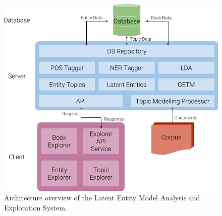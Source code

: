\documentclass[10pt]{report}
\begin{document}
\begin{figure}[h!]
  \centering
  \includegraphics[scale=0.55]{architecture_diagram}

    
  
  \caption{Architecture overview of the Latent Entity Model Analysis and Exploration System. \label{fig:architeture_overview}}
\end{figure}
\end{document}
